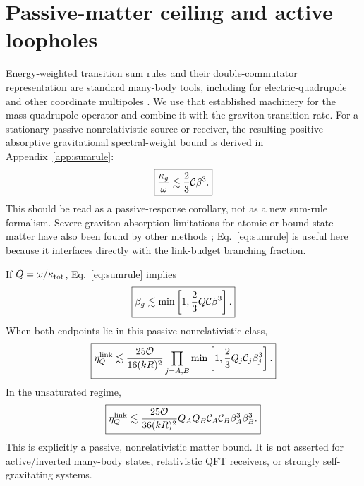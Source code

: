 \section{Passive-matter ceiling and active loopholes}
\label{sec:bounds}

Energy-weighted transition sum rules and their double-commutator representation are standard many-body tools, including for electric-quadrupole and other coordinate multipoles \cite{LuJohnson2018,Hinohara2019}. We use that established machinery for the mass-quadrupole operator and combine it with the graviton transition rate. For a stationary passive nonrelativistic source or receiver, the resulting positive absorptive gravitational spectral-weight bound is derived in Appendix~\ref{app:sumrule}:
\begin{equation}
\boxed{
\frac{\kappa_g}{\omega}
\lesssim\frac23\mathcal C\beta^3.}
\label{eq:sumrule}
\end{equation}
This should be read as a passive-response corollary, not as a new sum-rule formalism. Severe graviton-absorption limitations for atomic or bound-state matter have also been found by other methods \cite{BoughnRothman2006,PalessandroSloth2020}; Eq.~\eqref{eq:sumrule} is useful here because it interfaces directly with the link-budget branching fraction.

If $Q=\omega/\kappa_{\rm tot}$, Eq.~\eqref{eq:sumrule} implies
\begin{equation}
\boxed{
\beta_g\lesssim
\min\left[1,\frac23Q\mathcal C\beta^3\right].}
\label{eq:betabound}
\end{equation}
When both endpoints lie in this passive nonrelativistic class,
\begin{equation}
\boxed{
\eta_Q^{\rm link}
\lesssim
\frac{25\mathcal O}{16(kR)^2}
\prod_{j=A,B}
\min\left[1,\frac23Q_j\mathcal C_j\beta_j^3\right].}
\label{eq:passivebound}
\end{equation}
In the unsaturated regime,
\begin{equation}
\boxed{
\eta_Q^{\rm link}
\lesssim
\frac{25\mathcal O}{36(kR)^2}
Q_AQ_B\mathcal C_A\mathcal C_B\beta_A^3\beta_B^3.}
\label{eq:passiveunsat}
\end{equation}
This is explicitly a passive, nonrelativistic matter bound. It is not asserted for active/inverted many-body states, relativistic QFT receivers, or strongly self-gravitating systems.

